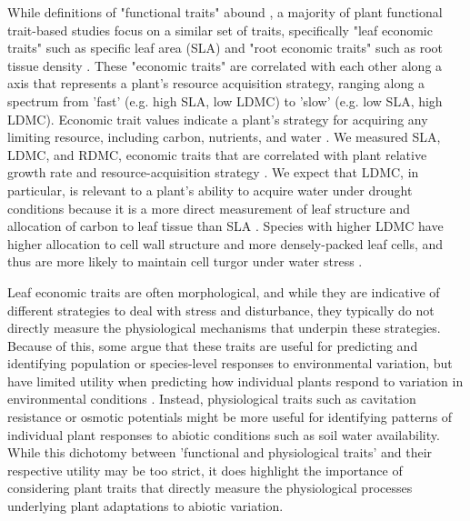 \documentclass[12pt, letterpaper]{article}
\begin{document}
While definitions of "functional traits" abound \citep{Violle2007,Volaire2020WhatProcesses,Mcgill2006}, a majority of plant functional trait-based studies focus on a similar set of traits, specifically "leaf economic traits" such as specific leaf area (SLA) \citep{Wright2004, Reich2014} and "root economic traits" such as root tissue density \citep{Kramer-Walter2016}. These "economic traits" are correlated with each other along a axis that represents a plant's resource acquisition strategy, ranging along a spectrum from 'fast' (e.g. high SLA, low LDMC) to 'slow' (e.g. low SLA, high LDMC). Economic trait values indicate a plant's strategy for acquiring any limiting resource, including carbon, nutrients, and water \citep{Reich2014}. 
We measured SLA, LDMC, and RDMC, economic traits that are correlated with plant relative growth rate and resource-acquisition strategy \citep{Weiher1999ChallengingEcology}. We expect that LDMC, in particular, is relevant to a plant's ability to acquire water under drought conditions because it is a more direct measurement of leaf structure and allocation of carbon to leaf tissue than SLA \citep{Niinemets1999ComponentsPlants,Hodgson2011}. Species with higher LDMC have higher allocation to cell wall structure and more densely-packed leaf cells, and thus are more likely to maintain cell turgor under water stress \citep{Niinemets2001Global-scaleShrubs,Poorter2009CausesMeta-analysis,Wilcox2020PlantPrairie}.


Leaf economic traits are often morphological, and while they are indicative of different strategies to deal with stress and disturbance, they typically do not directly measure the physiological mechanisms that underpin these strategies. Because of this, some argue that these traits are useful for predicting and identifying population or species-level responses to environmental variation, but  have limited utility when predicting how individual plants respond to variation in environmental conditions \citep{Volaire2018}. Instead, physiological traits such as cavitation resistance or osmotic potentials might be more useful for identifying patterns of individual plant responses to abiotic conditions such as soil water availability. While this dichotomy between 'functional and physiological traits' and their respective utility may be too strict, it does highlight the importance of considering plant traits that directly measure the physiological processes underlying plant adaptations to abiotic variation. 
\end{document}
